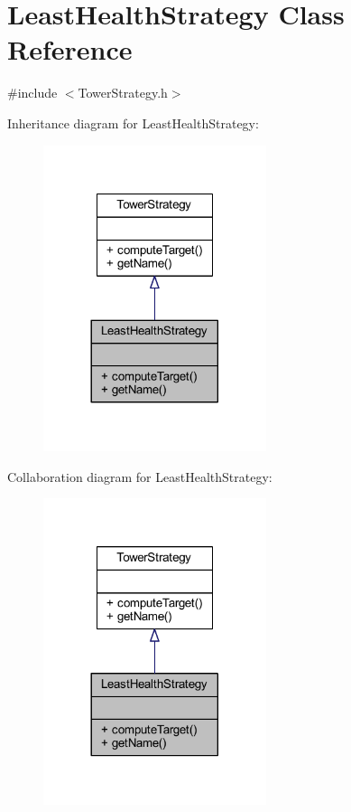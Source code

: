 \hypertarget{class_least_health_strategy}{\section{Least\+Health\+Strategy Class Reference}
\label{class_least_health_strategy}
}


{\ttfamily \#include $<$Tower\+Strategy.\+h$>$}



Inheritance diagram for Least\+Health\+Strategy\+:\nopagebreak
\begin{figure}[H]
\begin{center}
\leavevmode
\includegraphics[width=185pt]{class_least_health_strategy__inherit__graph}
\end{center}
\end{figure}


Collaboration diagram for Least\+Health\+Strategy\+:\nopagebreak
\begin{figure}[H]
\begin{center}
\leavevmode
\includegraphics[width=185pt]{class_least_health_strategy__coll__graph}
\end{center}
\end{figure}
